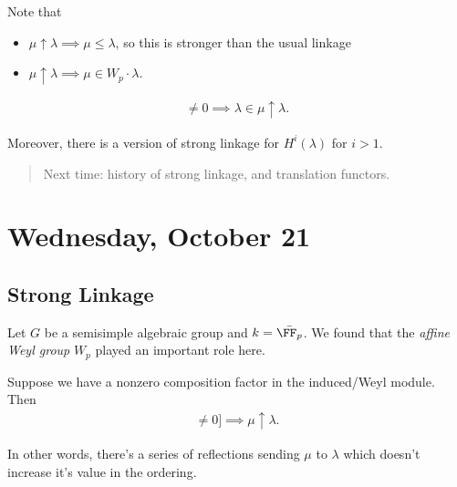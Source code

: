 \begin{remark}

Note that

\begin{itemize}
\tightlist
\item
  \(\mu \uparrow \lambda \implies \mu \leq \lambda\), so this is
  stronger than the usual linkage
\item
  \(\mu \uparrow \lambda \implies \mu \in W_p \cdot \lambda\).
\end{itemize}

\end{remark}

\begin{theorem}

\begin{align*}  
[H^0(\lambda): L(\mu)] \neq 0 \implies \lambda \in \mu \uparrow \lambda
.\end{align*}

Moreover, there is a version of strong linkage for \(H^i(\lambda)\) for
\(i> 1\).

\end{theorem}

\begin{quote}
Next time: history of strong linkage, and translation functors.
\end{quote}

\hypertarget{wednesday-october-21}{%
\section{Wednesday, October 21}\label{wednesday-october-21}}

\hypertarget{strong-linkage}{%
\subsection{Strong Linkage}\label{strong-linkage}}

Let \(G\) be a semisimple algebraic group and \(k = \bar{\FF_p}\). We
found that the \emph{affine Weyl group} \(W_p\) played an important role
here.

\begin{theorem}

Suppose we have a nonzero composition factor in the induced/Weyl module.
Then
\begin{align*}
[H^0 \lambda : L(\mu)] \neq 0]\implies \mu \uparrow \lambda
.\end{align*}

In other words, there's a series of reflections sending \(\mu\) to
\(\lambda\) which doesn't increase it's value in the ordering.

\end{theorem}

